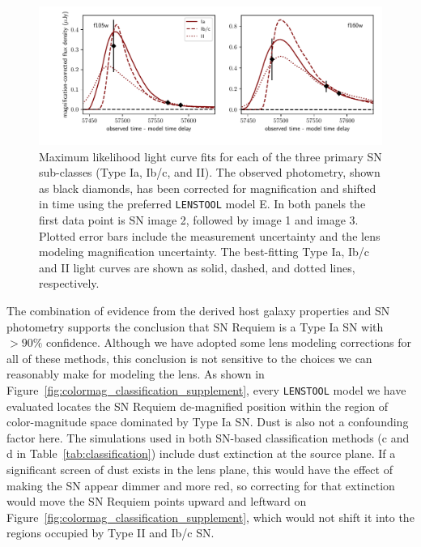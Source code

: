\documentclass[12pt,dvipsnames]{article}
\def\SNABC{SN Requiem\xspace}
\def\lenstool{{\tt LENSTOOL}\xspace}
\begin{document}
\begin{figure}
    \centering
    \includegraphics[width=\textwidth]{Paper/Figures/snRequiem_stardust_classify_alltypes.pdf}
    \caption{Maximum likelihood light curve fits for each of the three primary SN sub-classes (Type Ia, Ib/c, and II).  The observed photometry, shown as black diamonds, has been corrected for magnification and shifted in time using the preferred \lenstool model E. In both panels the first data point is SN image 2, followed by image 1 and image 3. Plotted error bars include the measurement uncertainty and the lens modeling magnification uncertainty.  The best-fitting Type Ia, Ib/c and II light curves are shown as solid, dashed, and dotted lines, respectively. 
    \label{fig:classification_lightcurves}
    }
\end{figure}

The combination of evidence from the derived host galaxy properties  and SN photometry supports the conclusion that \SNABC  is  a Type Ia SN with $>90\%$ confidence.  Although we have adopted some lens modeling corrections for all of these methods, this conclusion is not sensitive to the choices we can reasonably make for modeling the lens.  As shown in Figure~\ref{fig:colormag_classification_supplement}, every  \lenstool model we have evaluated locates the \SNABC  de-magnified position within the region of color-magnitude space dominated by Type Ia SN. Dust is also not a confounding factor here. 
The simulations used in both SN-based classification methods (c and d in Table~\ref{tab:classification}) include dust extinction at the source plane.  If a significant screen of dust exists in the lens plane, this would have the effect of making the SN appear dimmer and more red, so correcting for that extinction would move the \SNABC points upward and leftward on Figure~\ref{fig:colormag_classification_supplement}, which would not shift it into the regions occupied by Type II and Ib/c SN. 
\end{document}
